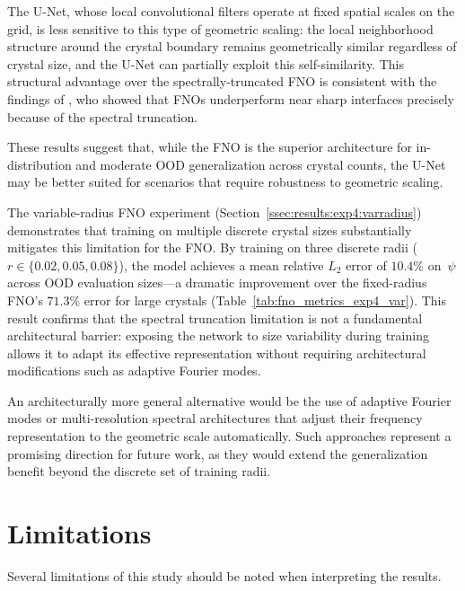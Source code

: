 The U-Net, whose local convolutional filters operate at fixed spatial scales on the grid, is less sensitive to this type of geometric scaling: the local neighborhood structure around the crystal boundary remains geometrically similar regardless of crystal size, and the U-Net can partially exploit this self-similarity. This structural advantage over the spectrally-truncated FNO is consistent with the findings of \textcite{qin_toward_2024}, who showed that FNOs underperform near sharp interfaces precisely because of the spectral truncation.

These results suggest that, while the FNO is the superior architecture for in-distribution and moderate OOD generalization across crystal counts, the U-Net may be better suited for scenarios that require robustness to geometric scaling.

The variable-radius FNO experiment (Section~\ref{ssec:results:exp4:varradius}) demonstrates that training on multiple discrete crystal sizes substantially mitigates this limitation for the FNO. By training on three discrete radii ($r \in \{0.02, 0.05, 0.08\}$), the model achieves a mean relative $L_2$ error of $10.4\%$ on~$\psi$ across OOD evaluation sizes—a dramatic improvement over the fixed-radius FNO's $71.3\%$ error for large crystals (Table~\ref{tab:fno_metrics_exp4_var}). This result confirms that the spectral truncation limitation is not a fundamental architectural barrier: exposing the network to size variability during training allows it to adapt its effective representation without requiring architectural modifications such as adaptive Fourier modes.

An architecturally more general alternative would be the use of adaptive Fourier modes or multi-resolution spectral architectures that adjust their frequency representation to the geometric scale automatically. Such approaches represent a promising direction for future work, as they would extend the generalization benefit beyond the discrete set of training radii.

\section{Limitations}

Several limitations of this study should be noted when interpreting the results.

